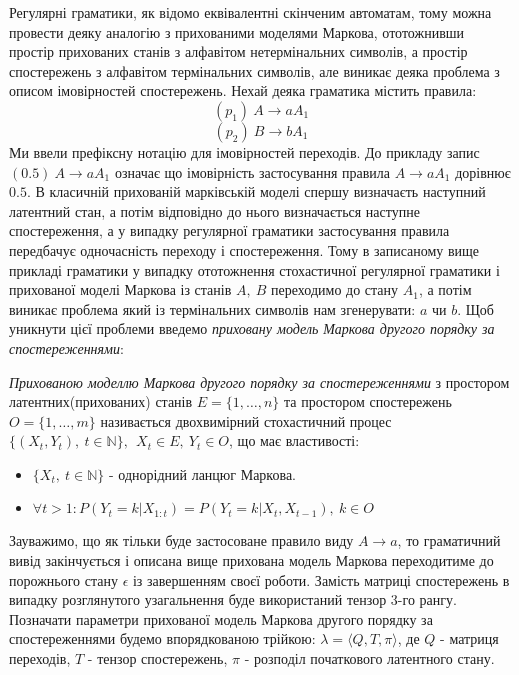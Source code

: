 Регулярні граматики, як відомо еквівалентні скінченим автоматам, тому можна провести деяку аналогію з прихованими моделями Маркова, ототожнивши простір прихованих станів з алфавітом нетермінальних символів, а простір спостережень з алфавітом термінальних символів, але виникає деяка проблема з описом імовірностей спостережень. Нехай деяка граматика містить правила:
$$ (p_1)\ A \rightarrow a A_1 $$
$$ (p_2)\ B \rightarrow b A_1 $$
Ми ввели префіксну нотацію для імовірностей переходів. До прикладу запис $ (0.5)\ A \rightarrow a A_1 $ означає що імовірність застосування правила $ A \rightarrow a A_1 $ дорівнює $0.5$. В класичній прихованій марківській моделі спершу визначаєть наступний латентний стан, а потім відповідно до нього визначається наступне спостереження, а у випадку регулярної граматики застосування правила передбачує одночасність переходу і спостереження. Тому в записаному вище прикладі граматики у випадку ототожнення стохастичної регулярної граматики і прихованої моделі Маркова із станів $A,\ B$ переходимо до стану $A_1$, а потім виникає проблема який із термінальних символів нам згенерувати: $a$ чи $b$. Щоб уникнути цієї проблеми введемо \textit{приховану модель Маркова другого порядку за спостереженнями}:
\begin{definition}
  \textit{Прихованою моделлю Маркова другого порядку за спостереженнями} з простором латентних(прихованих) станів $E = \{ 1,\dots,n \}$ та простором спостережень $O = \{ 1,\dots,m \}$ називається двохвимірний стохастичний процес $ \{ (X_t, Y_t),\ t \in \mathbb{N} \},\ \ X_t \in E,\ Y_t \in O $, що має властивості:
  \begin{itemize}
    \item $ \{ X_t,\ t \in \mathbb{N} \} $ - однорідний ланцюг Маркова.
    \item $ \forall t > 1 \colon P(Y_t = k | X_{1:t}) = P(Y_t = k | X_t, X_{t-1}),\ k \in O $
  \end{itemize}
\end{definition}
Зауважимо, що як тільки буде застосоване правило виду $ A \rightarrow a $, то граматичний вивід закінчується і описана вище прихована модель Маркова переходитиме до порожнього стану $\epsilon$ із завершенням своєї роботи. Замість матриці спостережень в випадку розглянутого узагальнення буде використаний тензор 3-го рангу. Позначати параметри прихованої модель Маркова другого порядку за спостереженнями будемо впорядкованою трійкою: $\lambda = \big\langle Q, T, \pi \big\rangle$, де $Q$ - матриця переходів, $T$ - тензор спостережень, $\pi$ - розподіл початкового латентного стану.
